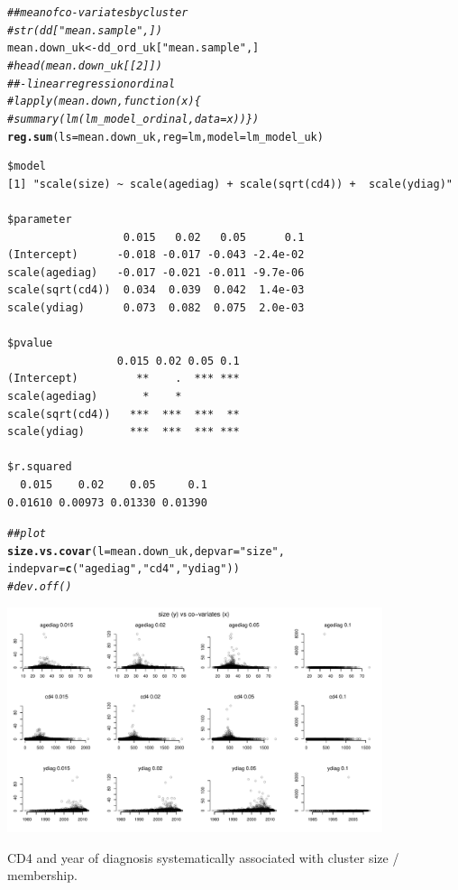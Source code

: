 \documentclass[]{revtex4}\usepackage[]{graphicx}\usepackage[]{color}
\makeatletter
\newcommand{\hlstr}[1]{\textcolor[rgb]{0.192,0.494,0.8}{#1}}%
\newcommand{\hlcom}[1]{\textcolor[rgb]{0.678,0.584,0.686}{\textit{#1}}}%
\newcommand{\hlstd}[1]{\textcolor[rgb]{0.345,0.345,0.345}{#1}}%
\newcommand{\hlkwb}[1]{\textcolor[rgb]{0.69,0.353,0.396}{#1}}%
\newcommand{\hlkwc}[1]{\textcolor[rgb]{0.333,0.667,0.333}{#1}}%
\newcommand{\hlkwd}[1]{\textcolor[rgb]{0.737,0.353,0.396}{\textbf{#1}}}%
\newenvironment{kframe}{%
 \def\at@end@of@kframe{}%
 \ifinner\ifhmode%
  \def\at@end@of@kframe{\end{minipage}}%
  \begin{minipage}{\columnwidth}%
 \fi\fi%
 \def\FrameCommand##1{\hskip\@totalleftmargin \hskip-\fboxsep
 \colorbox{shadecolor}{##1}\hskip-\fboxsep
     \hskip-\linewidth \hskip-\@totalleftmargin \hskip\columnwidth}%
 \MakeFramed {\advance\hsize-\width
   \@totalleftmargin\z@ \linewidth\hsize
   \@setminipage}}%
 {\par\unskip\endMakeFramed%
 \at@end@of@kframe}
\newenvironment{knitrout}{}{} %
\makeatother
\begin{document}
\begin{knitrout}
\color{fgcolor}\begin{kframe}
\begin{alltt}
\hlcom{## mean of co-variates by cluster}
\hlcom{# str(dd["mean.sample",])}
\hlstd{mean.down_uk} \hlkwb{<-} \hlstd{dd_ord_uk[}\hlstr{"mean.sample"}\hlstd{,]}
\hlcom{# head(mean.down_uk[[2]])}
\hlcom{##- linear regression ordinal}
\hlcom{#    lapply(mean.down, function(x) \{}
\hlcom{#    summary(lm(lm_model_ordinal, data = x))\})}
\hlkwd{reg.sum}\hlstd{(}\hlkwc{ls} \hlstd{= mean.down_uk,} \hlkwc{reg} \hlstd{= lm,} \hlkwc{model} \hlstd{= lm_model_uk)}
\end{alltt}
\begin{verbatim}
$model
[1] "scale(size) ~ scale(agediag) + scale(sqrt(cd4)) +  scale(ydiag)"

$parameter
                  0.015   0.02   0.05      0.1
(Intercept)      -0.018 -0.017 -0.043 -2.4e-02
scale(agediag)   -0.017 -0.021 -0.011 -9.7e-06
scale(sqrt(cd4))  0.034  0.039  0.042  1.4e-03
scale(ydiag)      0.073  0.082  0.075  2.0e-03

$pvalue
                 0.015 0.02 0.05 0.1
(Intercept)         **    .  *** ***
scale(agediag)       *    *         
scale(sqrt(cd4))   ***  ***  ***  **
scale(ydiag)       ***  ***  *** ***

$r.squared
  0.015    0.02    0.05     0.1 
0.01610 0.00973 0.01330 0.01390 
\end{verbatim}
\begin{alltt}
\hlcom{## plot}
\hlkwd{size.vs.covar}\hlstd{(}\hlkwc{l} \hlstd{= mean.down_uk,} \hlkwc{depvar} \hlstd{=} \hlstr{"size"}\hlstd{,}
\hlkwc{indepvar} \hlstd{=} \hlkwd{c}\hlstd{(}\hlstr{"agediag"}\hlstd{,} \hlstr{"cd4"}\hlstd{,} \hlstr{"ydiag"}\hlstd{))}
\hlcom{# dev.off()}
\end{alltt}
\end{kframe}

{\centering \includegraphics[width=11cm]{figure/plotrun_down-sample_UK_2-1} 

}



\end{knitrout}
CD4 and year of diagnosis systematically associated with cluster size / membership. 
\end{document}
